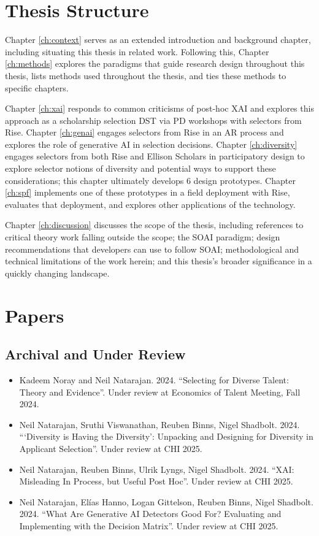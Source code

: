 \section{Thesis Structure}
Chapter \ref{ch:context} serves as an extended introduction and background chapter, including situating this thesis in related work. Following this, Chapter \ref{ch:methods} explores the paradigms that guide research design throughout this thesis, lists methods used throughout the thesis, and ties these methods to specific chapters.

Chapter \ref{ch:xai} responds to common criticisms of post-hoc XAI and explores this approach as a scholarship selection DST via PD workshops with selectors from Rise. Chapter \ref{ch:genai} engages selectors from Rise in an AR process and explores the role of generative AI in selection decisions. Chapter \ref{ch:diversity} engages selectors from both Rise and Ellison Scholars in participatory design to explore selector notions of diversity and potential ways to support these considerations; this chapter ultimately develops 6 design prototypes. Chapter \ref{ch:spf} implements one of these prototypes in a field deployment with Rise, evaluates that deployment, and explores other applications of the technology.

Chapter \ref{ch:discussion} discusses the scope of the thesis, including references to critical theory work falling outside the scope; the SOAI paradigm; design recommendations that developers can use to follow SOAI; methodological and technical limitations of the work herein; and this thesis's broader significance in a quickly changing landscape. 

\section{Papers}
\subsection{Archival and Under Review}
\begin{itemize}
    \item Kadeem Noray and Neil Natarajan. 2024. ``Selecting for Diverse Talent: Theory and Evidence''. Under review at Economics of Talent Meeting, Fall 2024.
    \item Neil Natarajan, Sruthi Viswanathan, Reuben Binns, Nigel Shadbolt. 2024. ```Diversity is Having the Diversity': Unpacking and Designing for Diversity in Applicant Selection''. Under review at CHI 2025.
    \item Neil Natarajan, Reuben Binns, Ulrik Lyngs, Nigel Shadbolt. 2024. ``XAI: Misleading In Process, but Useful Post Hoc''. Under review at CHI 2025.
    \item Neil Natarajan, Elías Hanno, Logan Gittelson, Reuben Binns, Nigel Shadbolt. 2024. ``What Are Generative AI Detectors Good For? Evaluating and Implementing with the Decision Matrix''. Under review at CHI 2025.
\end{itemize}

